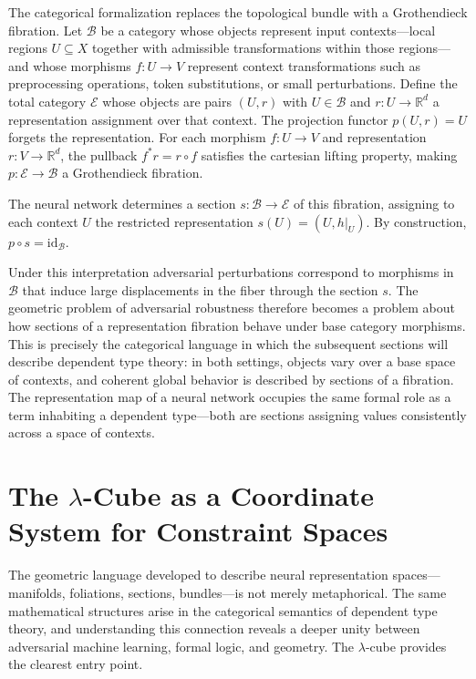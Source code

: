 \documentclass[12pt,a4paper]{article}
\theoremstyle{plain}
\theoremstyle{definition}
\newcommand{\E}{\mathcal{E}}
\newcommand{\B}{\mathcal{B}}
\begin{document}
The categorical formalization replaces the topological bundle with a
Grothendieck fibration. Let $\B$ be a category whose objects represent input
contexts---local regions $U \subseteq X$ together with admissible
transformations within those regions---and whose morphisms $f : U \to V$
represent context transformations such as preprocessing operations, token
substitutions, or small perturbations. Define the total category $\E$ whose
objects are pairs $(U, r)$ with $U \in \B$ and $r : U \to \mathbb{R}^d$ a
representation assignment over that context. The projection functor
$p(U, r) = U$ forgets the representation. For each morphism $f : U \to V$ and
representation $r : V \to \mathbb{R}^d$, the pullback $f^* r = r \circ f$
satisfies the cartesian lifting property, making $p : \E \to \B$ a Grothendieck
fibration.

The neural network determines a section $s : \B \to \E$ of this fibration,
assigning to each context $U$ the restricted representation $s(U) = (U, h|_U)$.
By construction, $p \circ s = \mathrm{id}_\B$.

Under this interpretation adversarial perturbations correspond to morphisms in
$\B$ that induce large displacements in the fiber through the section $s$. The
geometric problem of adversarial robustness therefore becomes a problem about
how sections of a representation fibration behave under base category
morphisms. This is precisely the categorical language in which the subsequent
sections will describe dependent type theory: in both settings, objects vary
over a base space of contexts, and coherent global behavior is described by
sections of a fibration. The representation map of a neural network occupies
the same formal role as a term inhabiting a dependent type---both are sections
assigning values consistently across a space of contexts.

\section{The $\lambda$-Cube as a Coordinate System for Constraint Spaces}
\label{sec:cube}

The geometric language developed to describe neural representation
spaces---manifolds, foliations, sections, bundles---is not merely metaphorical.
The same mathematical structures arise in the categorical semantics of dependent
type theory, and understanding this connection reveals a deeper unity between
adversarial machine learning, formal logic, and geometry. The $\lambda$-cube
provides the clearest entry point.
\end{document}
